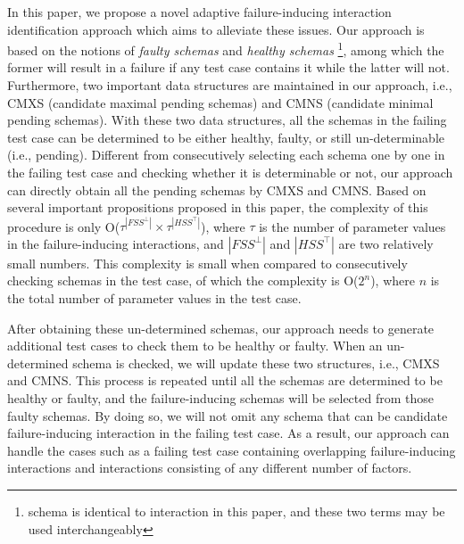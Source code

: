 \documentclass{sig-alternate-05-2015}
\begin{document}
In this paper, we propose a novel adaptive failure-inducing interaction identification approach which aims to alleviate these issues. Our approach is based on the notions of \emph{faulty schemas} and \emph{healthy schemas} \footnote{schema is identical to interaction in this paper, and these two terms may be used interchangeably}, among which the former will result in a failure if any test case contains it while the latter will not. Furthermore, two important data structures are maintained in our approach, i.e., CMXS (candidate maximal pending schemas) and CMNS (candidate minimal pending schemas). With these two data structures, all the schemas in the failing test case can be determined to be either healthy, faulty, or still un-determinable (i.e., pending). Different from consecutively selecting each schema one by one in the failing test case and checking whether it is determinable or not, our approach can directly obtain all the pending schemas by CMXS and CMNS. Based on several important propositions proposed in this paper, the complexity of this procedure is only O($ \tau^{|FSS^{\bot}|} \times \tau^{|HSS^{\top}|}$), where $\tau$ is the number of parameter values in the failure-inducing interactions, and $|FSS^{\bot}|$ and $|HSS^{\top}|$ are two relatively small numbers. This complexity is small when compared to consecutively checking schemas in the test case, of which the complexity is O($2^{n}$), where $n$ is the total number of parameter values in the test case.

After obtaining these un-determined schemas, our approach needs to generate additional test cases to check them to be healthy or faulty. When an un-determined schema is checked, we will update these two structures, i.e., CMXS and CMNS. This process is repeated until all the schemas are determined to be healthy or faulty, and the failure-inducing schemas will be selected from those faulty schemas. By doing so, we will not omit any schema that can be candidate failure-inducing interaction in the failing test case. As a result, our approach can handle the cases such as a failing test case containing overlapping failure-inducing interactions and interactions consisting of any different number of factors.
\end{document}
